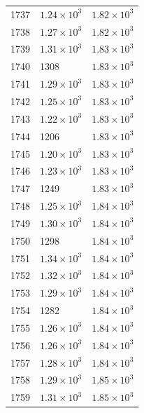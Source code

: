 \begin{table}[H]
\begin{tabular}{lll}
1737 & $\displaystyle 1.24 \times 10^{3}$ & $\displaystyle 1.82 \times 10^{3}$ \\
1738 & $\displaystyle 1.27 \times 10^{3}$ & $\displaystyle 1.82 \times 10^{3}$ \\
1739 & $\displaystyle 1.31 \times 10^{3}$ & $\displaystyle 1.83 \times 10^{3}$ \\
1740 & 1308 & $\displaystyle 1.83 \times 10^{3}$ \\
1741 & $\displaystyle 1.29 \times 10^{3}$ & $\displaystyle 1.83 \times 10^{3}$ \\
1742 & $\displaystyle 1.25 \times 10^{3}$ & $\displaystyle 1.83 \times 10^{3}$ \\
1743 & $\displaystyle 1.22 \times 10^{3}$ & $\displaystyle 1.83 \times 10^{3}$ \\
1744 & 1206 & $\displaystyle 1.83 \times 10^{3}$ \\
1745 & $\displaystyle 1.20 \times 10^{3}$ & $\displaystyle 1.83 \times 10^{3}$ \\
1746 & $\displaystyle 1.23 \times 10^{3}$ & $\displaystyle 1.83 \times 10^{3}$ \\
1747 & 1249 & $\displaystyle 1.83 \times 10^{3}$ \\
1748 & $\displaystyle 1.25 \times 10^{3}$ & $\displaystyle 1.84 \times 10^{3}$ \\
1749 & $\displaystyle 1.30 \times 10^{3}$ & $\displaystyle 1.84 \times 10^{3}$ \\
1750 & 1298 & $\displaystyle 1.84 \times 10^{3}$ \\
1751 & $\displaystyle 1.34 \times 10^{3}$ & $\displaystyle 1.84 \times 10^{3}$ \\
1752 & $\displaystyle 1.32 \times 10^{3}$ & $\displaystyle 1.84 \times 10^{3}$ \\
1753 & $\displaystyle 1.29 \times 10^{3}$ & $\displaystyle 1.84 \times 10^{3}$ \\
1754 & 1282 & $\displaystyle 1.84 \times 10^{3}$ \\
1755 & $\displaystyle 1.26 \times 10^{3}$ & $\displaystyle 1.84 \times 10^{3}$ \\
1756 & $\displaystyle 1.26 \times 10^{3}$ & $\displaystyle 1.84 \times 10^{3}$ \\
1757 & $\displaystyle 1.28 \times 10^{3}$ & $\displaystyle 1.84 \times 10^{3}$ \\
1758 & $\displaystyle 1.29 \times 10^{3}$ & $\displaystyle 1.85 \times 10^{3}$ \\
1759 & $\displaystyle 1.31 \times 10^{3}$ & $\displaystyle 1.85 \times 10^{3}$ \\

\end{tabular}
\end{table}
